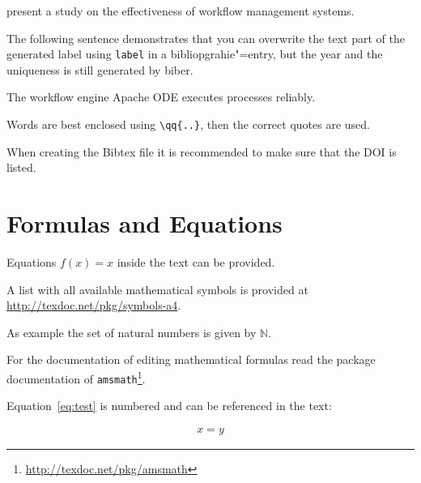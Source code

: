 \begin{filecontents*}{\democodefile}
 present a study on the effectiveness of workflow management systems.
\end{filecontents*}

The following sentence demonstrates that you can overwrite the text part of the generated label using \texttt{label} in a bibliopgrahie"=entry, but the year and the uniqueness is still generated by biber.

\begin{filecontents*}{\democodefile}
The workflow engine Apache ODE \cite{ApacheODE} executes \BPEL processes reliably.
\end{filecontents*}

\begin{filecontents*}{\democodefile}
Words are best enclosed using \texttt{\textbackslash qq\{..\}}, then the correct quotes are used.
\end{filecontents*}

When creating the Bibtex file it is recommended to make sure that the DOI is listed.

\section{Formulas and Equations}
\label{sec:mf}

\begin{filecontents*}{\democodefile}
Equations $f(x)=x$ inside the text can be provided.
\end{filecontents*}

A list with all available mathematical symbols is provided at \url{http://texdoc.net/pkg/symbols-a4}.

\begin{filecontents*}{\democodefile}
As example the set of natural numbers is given by $\mathbb{N}$.
\end{filecontents*}

For the documentation of editing mathematical formulas read the package documentation of \texttt{amsmath}\footnote{\url{http://texdoc.net/pkg/amsmath}}.

Equation~\ref{eq:test} is numbered and can be referenced in the text:
\begin{filecontents*}{\democodefile}
\begin{align}
  \label{eq:test}
  x = y
\end{align}
\end{filecontents*}

